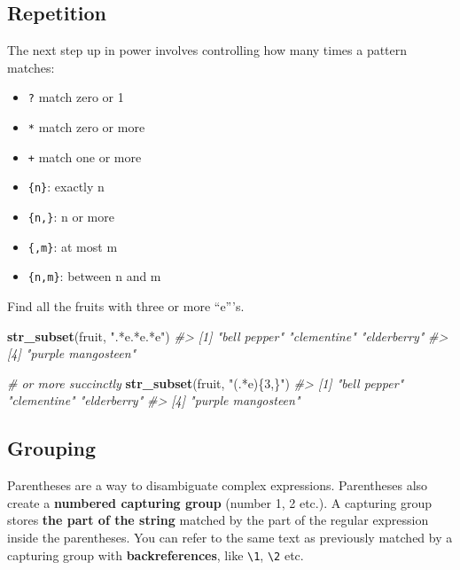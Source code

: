 \documentclass[]{book}
\newenvironment{Shaded}{\begin{snugshade}}{\end{snugshade}}
\newcommand{\CommentTok}[1]{\textcolor[rgb]{0.56,0.35,0.01}{\textit{#1}}}
\newcommand{\KeywordTok}[1]{\textcolor[rgb]{0.13,0.29,0.53}{\textbf{#1}}}
\newcommand{\NormalTok}[1]{#1}
\newcommand{\StringTok}[1]{\textcolor[rgb]{0.31,0.60,0.02}{#1}}
\providecommand{\tightlist}{%
  \setlength{\itemsep}{0pt}\setlength{\parskip}{0pt}}
\theoremstyle{definition}
\theoremstyle{definition}
\theoremstyle{definition}
\theoremstyle{remark}
\begin{document}
\hypertarget{repetition}{%
\subsection{Repetition}\label{repetition}}

The next step up in power involves controlling how many times a pattern
matches:

\begin{itemize}
\tightlist
\item
  \texttt{?} match zero or 1
\item
  \texttt{*} match zero or more
\item
  \texttt{+} match one or more
\item
  \texttt{\{n\}}: exactly n
\item
  \texttt{\{n,\}}: n or more
\item
  \texttt{\{,m\}}: at most m
\item
  \texttt{\{n,m\}}: between n and m
\end{itemize}

Find all the fruits with three or more ``e'''s.

\begin{Shaded}
\begin{Highlighting}[]
\KeywordTok{str_subset}\NormalTok{(fruit, }\StringTok{".*e.*e.*e"}\NormalTok{) }
\CommentTok{#> [1] "bell pepper"       "clementine"        "elderberry"       }
\CommentTok{#> [4] "purple mangosteen"}

\CommentTok{# or more succinctly}
\KeywordTok{str_subset}\NormalTok{(fruit, }\StringTok{"(.*e)\{3,\}"}\NormalTok{)}
\CommentTok{#> [1] "bell pepper"       "clementine"        "elderberry"       }
\CommentTok{#> [4] "purple mangosteen"}
\end{Highlighting}
\end{Shaded}

\hypertarget{grouping}{%
\subsection{Grouping}\label{grouping}}

Parentheses are a way to disambiguate complex expressions. Parentheses
also create a \textbf{numbered capturing group} (number 1, 2 etc.). A
capturing group stores \textbf{the part of the string} matched by the
part of the regular expression inside the parentheses. You can refer to
the same text as previously matched by a capturing group with
\textbf{backreferences}, like \texttt{\textbackslash{}1},
\texttt{\textbackslash{}2} etc.
\end{document}
